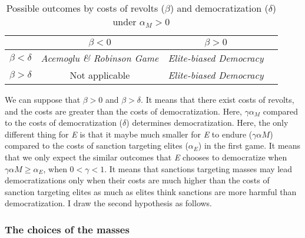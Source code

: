 \documentclass[11pt]{article}
\newtheorem{hyp}{Hypothesis}
\begin{document}
\begin{table}[!ht]
	\centering
	\begin{tabular}{l*{3}{c}}
		\toprule
		&\multicolumn{1}{c}{$\beta < 0$}		&\multicolumn{1}{c}{$\beta > 0$} \\
		\midrule
		$\beta < \delta$	   & \textit{Acemoglu \& Robinson Game} & \textit{Elite-biased Democracy}\\
		$\beta > \delta$	   & Not applicable					 	& \textit{Elite-biased Democracy}\\
		\bottomrule
	\end{tabular}
	\caption{Possible outcomes by costs of revolts ($\beta$) and democratization ($\delta$) under $\alpha_{M} > 0$}
	\label{tab:table2}
\end{table}


We can suppose that $\beta > 0$ and $\beta > \delta$. It means that there exist costs of revolts, and the costs are greater than the costs of democratization. Here, $\gamma\alpha_{M}$ compared to the costs of democratization ($\delta$) determines democratization. Here, the only different thing for \textit{E} is that it maybe much smaller for \textit{E} to endure ($\gamma\alpha{M}$) compared to the costs of sanction targeting elites ($\alpha_{E}$) in the first game. It means that we only expect the similar outcomes that \textit{E} chooses to democratize when $\gamma\alpha{M} \geq \alpha_{E}$, when $0 < \gamma < 1$. It means that sanctions targeting masses may  lead democratizations only when their costs are much higher than the costs of sanction targeting elites as much as elites think sanctions are more harmful than democratization. I draw the second hypothesis as follows.




	

\subsubsection*{The choices of the masses}
\end{document}
